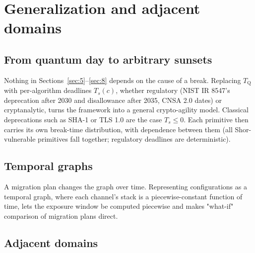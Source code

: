 \documentclass[conference]{IEEEtran}
\newcommand{\Tq}{T_{\mathrm{Q}}}
\begin{document}
\section{Generalization and adjacent domains}\label{sec:11}

\subsection{From quantum day to arbitrary sunsets}\label{sec:11.1}

Nothing in Sections~\ref{sec:5}--\ref{sec:8} depends on the cause of a break. Replacing $\Tq$ with per-algorithm deadlines $T_s(c)$, whether regulatory (NIST IR 8547's deprecation after 2030 and disallowance after 2035, CNSA 2.0 dates) or cryptanalytic, turns the framework into a general crypto-agility model. Classical deprecations such as SHA-1 or TLS 1.0 are the case $T_s \le 0$. Each primitive then carries its own break-time distribution, with dependence between them (all Shor-vulnerable primitives fall together; regulatory deadlines are deterministic).

\subsection{Temporal graphs}\label{sec:11.2}

A migration plan changes the graph over time. Representing configurations as a temporal graph, where each channel's stack is a piecewise-constant function of time, lets the exposure window be computed piecewise and makes "what-if" comparison of migration plans direct.

\subsection{Adjacent domains}\label{sec:11.3}
\end{document}
